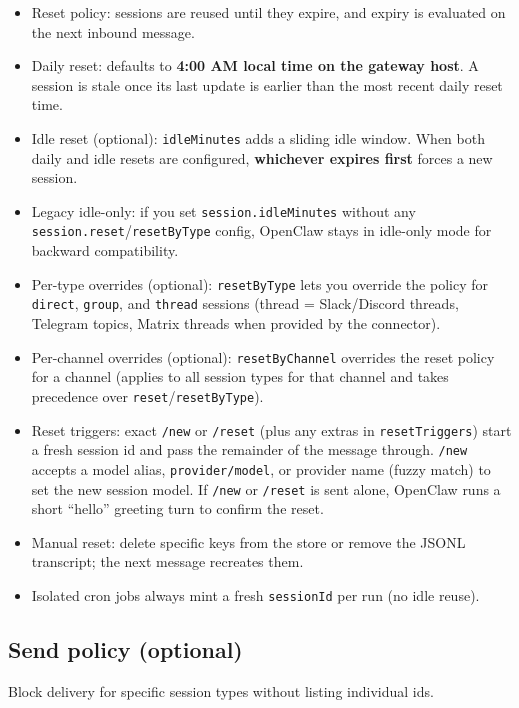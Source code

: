 \begin{itemize}
  \item Reset policy: sessions are reused until they expire, and expiry is evaluated on the next inbound message.
  \item Daily reset: defaults to \textbf{4:00 AM local time on the gateway host}. A session is stale once its last update is earlier than the most recent daily reset time.
  \item Idle reset (optional): \texttt{idleMinutes} adds a sliding idle window. When both daily and idle resets are configured, \textbf{whichever expires first} forces a new session.
  \item Legacy idle-only: if you set \texttt{session.idleMinutes} without any \texttt{session.reset}/\texttt{resetByType} config, OpenClaw stays in idle-only mode for backward compatibility.
  \item Per-type overrides (optional): \texttt{resetByType} lets you override the policy for \texttt{direct}, \texttt{group}, and \texttt{thread} sessions (thread = Slack/Discord threads, Telegram topics, Matrix threads when provided by the connector).
  \item Per-channel overrides (optional): \texttt{resetByChannel} overrides the reset policy for a channel (applies to all session types for that channel and takes precedence over \texttt{reset}/\texttt{resetByType}).
  \item Reset triggers: exact \texttt{/new} or \texttt{/reset} (plus any extras in \texttt{resetTriggers}) start a fresh session id and pass the remainder of the message through. \texttt{/new } accepts a model alias, \texttt{provider/model}, or provider name (fuzzy match) to set the new session model. If \texttt{/new} or \texttt{/reset} is sent alone, OpenClaw runs a short “hello” greeting turn to confirm the reset.
  \item Manual reset: delete specific keys from the store or remove the JSONL transcript; the next message recreates them.
  \item Isolated cron jobs always mint a fresh \texttt{sessionId} per run (no idle reuse).
\end{itemize}


\subsection{Send policy (optional)}


Block delivery for specific session types without listing individual ids.

